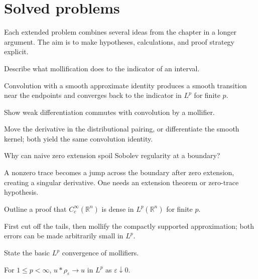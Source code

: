 \section{Solved problems}
Each extended problem combines several ideas from the chapter in a longer argument. The aim is to make hypotheses, calculations, and proof strategy explicit.

\begin{problem}\label{prob:iii22-problem-01}
Describe what mollification does to the indicator of an interval.
\end{problem}
\begin{solution}
Convolution with a smooth approximate identity produces a smooth transition
near the endpoints and converges back to the indicator in \(L^p\) for finite
\(p\).
\end{solution}

\begin{problem}\label{prob:iii22-problem-02}
Show weak differentiation commutes with convolution by a mollifier.
\end{problem}
\begin{solution}
Move the derivative in the distributional pairing, or differentiate the
smooth kernel; both yield the same convolution identity.
\end{solution}

\begin{problem}\label{prob:iii22-problem-03}
Why can naive zero extension spoil Sobolev regularity at a boundary?
\end{problem}
\begin{solution}
A nonzero trace becomes a jump across the boundary after zero extension,
creating a singular derivative. One needs an extension theorem or zero-trace
hypothesis.
\end{solution}

\begin{problem}\label{prob:iii22-problem-04}
Outline a proof that \(C_c^\infty(\mathbb R^n)\) is dense in \(L^p(\mathbb R^n)\) for finite \(p\).
\end{problem}
\begin{solution}
First cut off the tails, then mollify the compactly supported approximation;
both errors can be made arbitrarily small in \(L^p\).
\end{solution}

\begin{problem}\label{prob:iii22-problem-05}
State the basic \(L^p\) convergence of mollifiers.
\end{problem}
\begin{solution}
For \(1\le p<\infty\), \(u*\rho_\varepsilon\to u\) in \(L^p\) as
\(\varepsilon\downarrow0\).
\end{solution}

